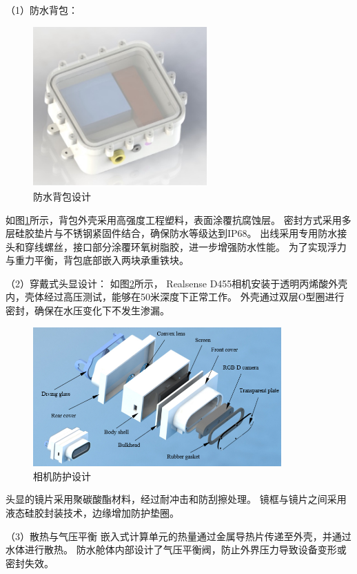 （1）防水背包：
\begin{figure}[h]
    \centering
    \includegraphics[width=0.6\textwidth]{figures/ch5/bag.jpg}
    \caption{防水背包设计}
    \label{img:bag}
\end{figure}

如图\ref{img:bag}所示，背包外壳采用高强度工程塑料，表面涂覆抗腐蚀层。
密封方式采用多层硅胶垫片与不锈钢紧固件结合，确保防水等级达到IP68。
出线采用专用防水接头和穿线螺丝，接口部分涂覆环氧树脂胶，进一步增强防水性能。
为了实现浮力与重力平衡，背包底部嵌入两块承重铁块。

（2）穿戴式头显设计：
如图\ref{img:camera}所示，
Realsense D455相机安装于透明丙烯酸外壳内，壳体经过高压测试，能够在50米深度下正常工作。
外壳通过双层O型圈进行密封，确保在水压变化下不发生渗漏。
\begin{figure}[ht]
    \centering
    \includegraphics[width=0.85\textwidth]{figures/ch5/headscreen.jpg}
    \caption{相机防护设计}
    \label{img:camera}
\end{figure}

头显的镜片采用聚碳酸酯材料，经过耐冲击和防刮擦处理。
镜框与镜片之间采用液态硅胶封装技术，边缘增加防护垫圈。

（3）散热与气压平衡
嵌入式计算单元的热量通过金属导热片传递至外壳，并通过水体进行散热。
防水舱体内部设计了气压平衡阀，防止外界压力导致设备变形或密封失效。

